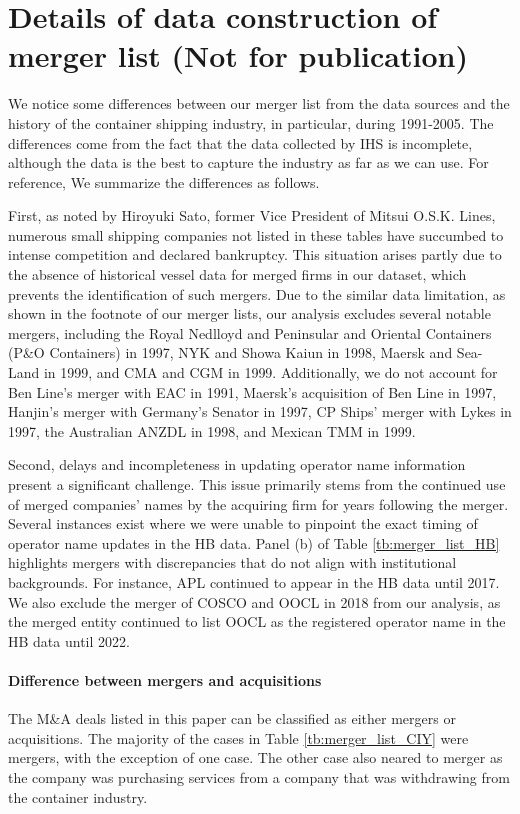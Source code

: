 \documentclass[10pt]{article}
\begin{document}



\newpage
\appendix
\section{Details of data construction of merger list (Not for publication)}\label{sec:details_of_data_construction}

We notice some differences between our merger list from the data sources and the history of the container shipping industry, in particular, during 1991-2005. 
The differences come from the fact that the data collected by IHS is incomplete, although the data is the best to capture the industry as far as we can use. For reference, We summarize the differences as follows. 

First, as noted by Hiroyuki Sato, former Vice President of Mitsui O.S.K. Lines, numerous small shipping companies not listed in these tables have succumbed to intense competition and declared bankruptcy. This situation arises partly due to the absence of historical vessel data for merged firms in our dataset, which prevents the identification of such mergers. Due to the similar data limitation, as shown in the footnote of our merger lists, our analysis excludes several notable mergers, including the Royal Nedlloyd and Peninsular and Oriental Containers (P\&O Containers) in 1997, NYK and Showa Kaiun in 1998, Maersk and Sea-Land in 1999, and CMA and CGM in 1999. Additionally, we do not account for Ben Line's merger with EAC in 1991, Maersk's acquisition of Ben Line in 1997, Hanjin's merger with Germany's Senator in 1997, CP Ships' merger with Lykes in 1997, the Australian ANZDL in 1998, and Mexican TMM in 1999.

Second, delays and incompleteness in updating operator name information present a significant challenge. This issue primarily stems from the continued use of merged companies' names by the acquiring firm for years following the merger. Several instances exist where we were unable to pinpoint the exact timing of operator name updates in the HB data. Panel (b) of Table \ref{tb:merger_list_HB} highlights mergers with discrepancies that do not align with institutional backgrounds. For instance, APL continued to appear in the HB data until 2017. We also exclude the merger of COSCO and OOCL in 2018 from our analysis, as the merged entity continued to list OOCL as the registered operator name in the HB data until 2022.

\paragraph{Difference between mergers and acquisitions}
The M\&A deals listed in this paper can be classified as either mergers or acquisitions. The majority of the cases in Table \ref{tb:merger_list_CIY} were mergers, with the exception of one case. The other case also neared to merger as the company was purchasing services from a company that was withdrawing from the container industry.
\end{document}
